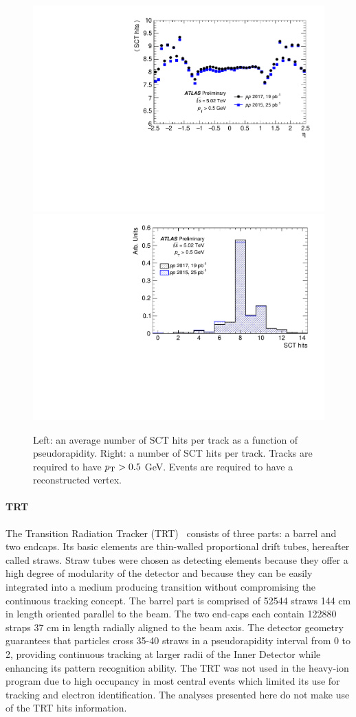 \begin{figure}[H]
\centering
\includegraphics[width=.475\linewidth]{figs/chapter_detector/ATLAS_ID_SCT_hits1.pdf}
\includegraphics[width=.475\linewidth]{figs/chapter_detector/ATLAS_ID_SCT_hits2.pdf}
\caption{Left: an average number of SCT hits per track as a function of pseudorapidity. Right: a number of SCT hits per track. Tracks are required to have $p_\text{T}>0.5$ GeV. Events are required to have a reconstructed vertex.}
\label{fig:detector_ATLAS_ID_SCT_hits}
\end{figure}



\paragraph{TRT}

The Transition Radiation Tracker (TRT)~\cite{Abat:2008zza} consists of three parts: a barrel and two endcaps. Its basic elements are thin-walled proportional drift tubes, hereafter called straws. Straw tubes were chosen as detecting elements because they offer a high degree of modularity of the detector and because they can be easily integrated into a medium producing transition without compromising the continuous tracking concept. The barrel part is comprised of 52544 straws 144 cm in length oriented parallel to the beam. The two end-caps each contain 122880 straps 37 cm in length radially aligned to the beam axis. The detector geometry guarantees that particles cross 35-40 straws in a pseudorapidity interval from 0 to 2, providing continuous tracking at larger radii of the Inner Detector while enhancing its pattern recognition ability. The TRT was not used in the heavy-ion program due to high occupancy in most central events which limited its use for tracking and electron identification. The analyses presented here do not make use of the TRT hits information.




